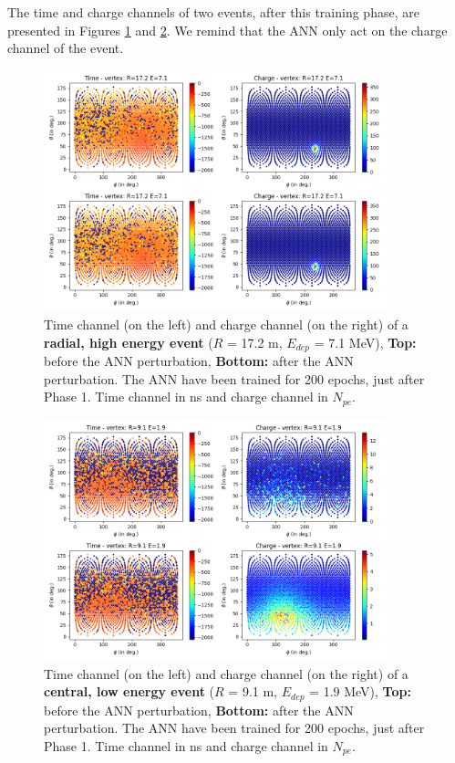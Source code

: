 \documentclass[../main.tex]{subfiles}
\begin{document}
The time and charge channels of two events, after this training phase, are presented in Figures \ref{fig:janne:hr_he_200} and \ref{fig:janne:lr_le_200}. We remind that the ANN only act on the charge channel of the event.
\begin{figure}[ht]
  \centering
  \includegraphics[height=7cm]{images/janne/events/hr_he_200.png}
  \caption{Time channel (on the left) and charge channel (on the right) of a \textbf{radial, high energy event} ($R$ = 17.2 m, $E_{dep}$ = 7.1 MeV), \textbf{Top:} before the ANN perturbation, \textbf{Bottom:} after the ANN perturbation. The ANN have been trained for 200 epochs, just after Phase 1. Time channel in ns and charge channel in $N_{pe}$.}
  \label{fig:janne:hr_he_200}
\end{figure}

\begin{figure}[ht]
  \centering
  \includegraphics[height=7cm]{images/janne/events/lr_le_200.png}
  \caption{Time channel (on the left) and charge channel (on the right) of a \textbf{central, low energy event} ($R$ = 9.1 m, $E_{dep}$ = 1.9 MeV), \textbf{Top:} before the ANN perturbation, \textbf{Bottom:} after the ANN perturbation. The ANN have been trained for 200 epochs, just after Phase 1. Time channel in ns and charge channel in $N_{pe}$.}
  \label{fig:janne:lr_le_200}
\end{figure}
\end{document}
